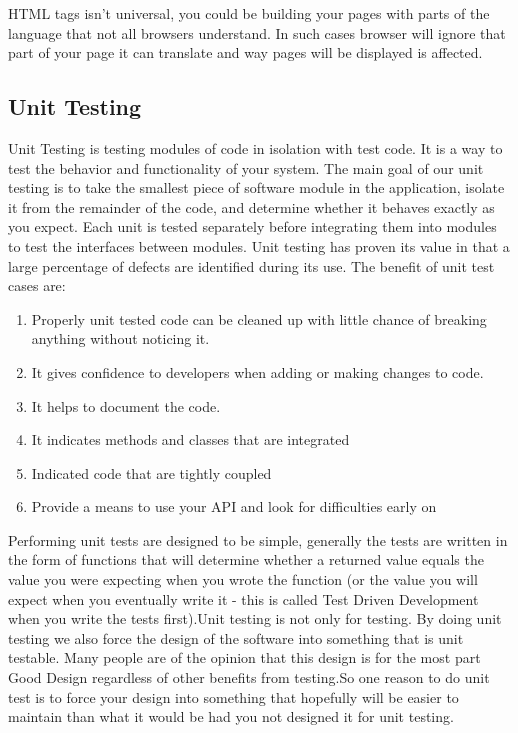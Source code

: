 \documentclass[article,type=msc,colorback,accentcolor=tud9c,twoside,11pt]{tudthesis}
\begin{document}
HTML tags isn't universal, you could be building your pages with parts of the language that not all browsers understand. In such cases browser will ignore that part of your page it can translate and way pages will be displayed is affected.

\subsection{Unit Testing}
Unit Testing\cite{EffectivnessofUnitTest} is testing modules of code in isolation with test code. It is a way to test the behavior and functionality of your system. The main goal of our unit testing is to take the smallest piece of software module in the application, isolate it from the remainder of the code, and determine whether it behaves exactly as you expect. Each unit is tested separately before integrating them into modules to test the interfaces between modules. Unit testing has proven its value in that a large percentage of defects are identified during its use. The benefit of unit test cases are:
\begin{enumerate}
	\item Properly unit tested code can be cleaned up with little chance of breaking anything without noticing it.
	\item It gives confidence to developers when adding or making changes to code.
	\item It helps to document the code.
	\item It indicates methods and classes that are integrated 
	\item Indicated code that are tightly coupled
	\item Provide a means to use your API and look for difficulties early on 
\end{enumerate}
Performing unit tests are designed to be simple, generally the tests are written in the form of functions that will determine whether a returned value equals the value you were expecting when you wrote the function (or the value you will expect when you eventually write it - this is called Test Driven Development when you write the tests first).Unit testing is not only for testing. By doing unit testing we also force the design of the software into something that is unit testable. Many people are of the opinion that this design is for the most part Good Design regardless of other benefits from testing.So one reason to do unit test is to force your design into something that hopefully will be easier to maintain than what it would be had you not designed it for unit testing.
\end{document}
